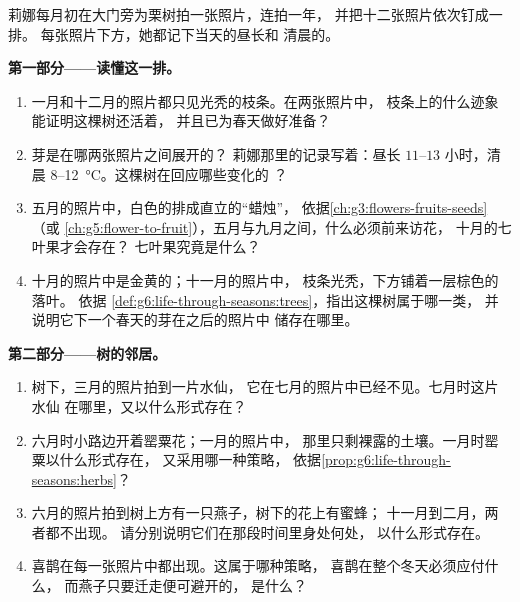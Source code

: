 \begin{problem}\label{pb:g6:life-through-seasons:1}
莉娜每月初在大门旁为栗树拍一张照片，连拍一年，
并把十二张照片依次钉成一排。
每张照片下方，她都记下当天的昼长和
清晨的。

\medskip\noindent\textbf{第一部分——读懂这一排。}
\begin{enumerate}
  \item 一月和十二月的照片都只见光秃的枝条。在两张照片中，
        枝条上的什么迹象能证明这棵树还活着，
        并且已为春天做好准备？
  \item 芽是在哪两张照片之间展开的？
        莉娜那里的记录写着：昼长
        $11$--$13$ 小时，清晨
        $8$--\qty{12}{\degreeCelsius}。这棵树在回应哪些变化的
        ？
  \item 五月的照片中，白色的排成直立的“蜡烛”，
        依据\cref{ch:g3:flowers-fruits-seeds}（或
        \cref{ch:g5:flower-to-fruit}），五月与九月之间，什么必须前来访花，
        十月的七叶果才会存在？
        七叶果究竟是什么？
  \item 十月的照片中是金黄的；十一月的照片中，
        枝条光秃，下方铺着一层棕色的落叶。
        依据
        \cref{def:g6:life-through-seasons:trees}，指出这棵树属于哪一类，
        并说明它下一个春天的芽在之后的照片中
        储存在哪里。
\end{enumerate}

\medskip\noindent\textbf{第二部分——树的邻居。}
\begin{enumerate}[resume]
  \item 树下，三月的照片拍到一片水仙，
        它在七月的照片中已经不见。七月时这片水仙
        在哪里，又以什么形式存在？
  \item 六月时小路边开着罂粟花；一月的照片中，
        那里只剩裸露的土壤。一月时罂粟以什么形式存在，
        又采用哪一种策略，
        依据\cref{prop:g6:life-through-seasons:herbs}？
  \item 六月的照片拍到树上方有一只燕子，树下的花上有蜜蜂；
        十一月到二月，两者都不出现。
        请分别说明它们在那段时间里身处何处，
        以什么形式存在。
  \item 喜鹊在每一张照片中都出现。这属于哪种策略，
        喜鹊在整个冬天必须应付什么，
        而燕子只要迁走便可避开的，
        是什么？
\end{enumerate}


\end{problem}
